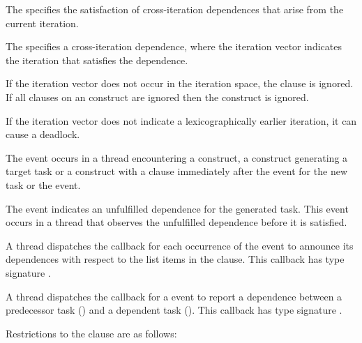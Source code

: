 The   specifies the satisfaction of
cross-iteration dependences that arise from the current iteration.

The   specifies a cross-iteration dependence,
where the iteration vector  indicates the iteration that satisfies
the dependence.

If the iteration vector  does not occur in the iteration space,
the  clause is ignored.  If all  clauses on an
 construct are ignored then the construct is ignored.

\begin{note}
If the iteration vector  does not indicate a lexicographically earlier iteration, it can cause a deadlock.
\end{note}

\events

The  event occurs in a thread encountering a
 construct, a construct generating a target task or a 
construct with a  clause immediately after 
the  event for the new task or the  event.

The  event indicates an unfulfilled dependence for the generated task.
This event occurs in a thread that observes the unfulfilled dependence before it is satisfied.

\tools

A thread dispatches the  callback
for each occurrence of the  event to
announce its dependences with respect to the list items in the  clause.
This callback has type signature
.

A thread dispatches the 
callback for a  event to report a
dependence between a predecessor task  () and a dependent task
().  This callback has type signature
.

\restrictions
Restrictions to the  clause are as follows:

